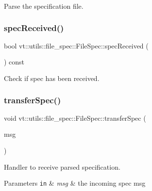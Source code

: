 Parse the specification file. 

\mbox{\label{structvt_1_1utils_1_1file__spec_1_1_file_spec_a0c22690c282b4dc4813de45b530a3adf}} 
\subsubsection{\texorpdfstring{spec\+Received()}{specReceived()}}
{\footnotesize\ttfamily bool vt\+::utils\+::file\+\_\+spec\+::\+File\+Spec\+::spec\+Received (\begin{DoxyParamCaption}{ }\end{DoxyParamCaption}) const\hspace{0.3cm}{\ttfamily [inline]}}



Check if spec has been received. 

\mbox{\label{structvt_1_1utils_1_1file__spec_1_1_file_spec_a2cc6d29fdfe7d69bb6ff93d35065011a}} 
\subsubsection{\texorpdfstring{transfer\+Spec()}{transferSpec()}}
{\footnotesize\ttfamily void vt\+::utils\+::file\+\_\+spec\+::\+File\+Spec\+::transfer\+Spec (\begin{DoxyParamCaption}\item[{\hyperlink{structvt_1_1utils_1_1file__spec_1_1_file_spec_1_1_spec_msg}{Spec\+Msg} $\ast$}]{msg }\end{DoxyParamCaption})\hspace{0.3cm}{\ttfamily [private]}}



Handler to receive parsed specification. 


\begin{DoxyParams}[1]{Parameters}
\mbox{\tt in}  & {\em msg} & the incoming spec msg \\
\hline
\end{DoxyParams}


